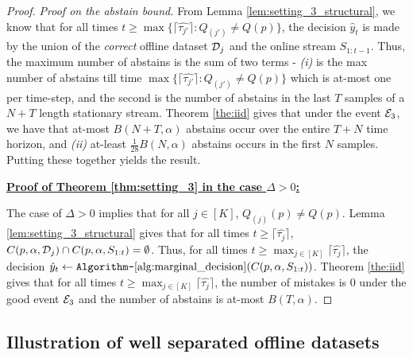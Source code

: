 \begin{proof}
{\textit{Proof on the abstain bound.} From Lemma \ref{lem:setting_3_structural}, we know that for all times $t \geq \max \{ \lceil \widehat{\tau_{j'}} \rceil : Q_{(j')} \neq Q(p) \}$, the decision $\hat{y}_t$ is made by the union of the \emph{correct} offline dataset ${\mathcal{D}}_j$ and the online stream $S_{1:t-1}$. Thus, the maximum number of abstains is the sum of two terms - {\em (i)} is the max number of abstains till time $\max \{ \lceil \widehat{\tau_{j'}} \rceil : Q_{(j')} \neq Q(p) \}$ which is at-most one per time-step, and the second is the number of abstains in the last $T$ samples of a $N+T$ length stationary stream. Theorem \ref{the:iid} gives that under the event ${\mathcal{E}}_3$, we have that at-most $B(N+T,\alpha)$ abstains occur over the entire $T+N$ time horizon, and {\em(ii)} at-least $\frac{1}{28}B(N, \alpha)$ abstains occurs in the first $N$ samples. Putting these together yields the result. 


}


{\color{black}

\textbf{\underline{Proof of Theorem \ref{thm:setting_3} in the case $\Delta > 0$:}} 

The case of $\Delta > 0$ implies that for all $j \in [K]$, $Q_{(j)}(p) \neq Q(p)$. Lemma \ref{lem:setting_3_structural} gives that for all times $t \geq \lceil \widehat{\tau_{j}} \rceil$, $C(p, \alpha, {\mathcal{D}}_j) \cap C(p, \alpha, S_{1:t}) = \emptyset$. Thus, for all times $t \geq \max_{j \in [K]} \lceil \widehat{\tau_{j}} \rceil$, the decision $\hat{y}_t \gets \text{{\ttfamily Algorithm-}\ref{alg:marginal_decision}}(C(p,\alpha, S_{1:t}))$. Theorem \ref{the:iid} gives that for all times $t \geq \max_{j \in [K]} \lceil \widehat{\tau_{j}} \rceil$, the number of mistakes is $0$ under the good event ${\mathcal{E}}_3$ and the number of abstains is at-most $B(T, \alpha)$. 




}
\end{proof}


\subsection{Illustration of well separated offline datasets}
\label{sec:illustrations}

